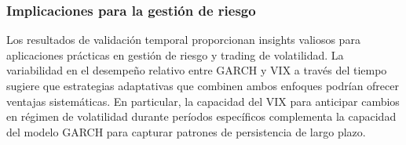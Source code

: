 \subsubsection{Implicaciones para la gestión de riesgo}

Los resultados de validación temporal proporcionan insights valiosos para aplicaciones prácticas en gestión de riesgo y trading de volatilidad. La variabilidad en el desempeño relativo entre GARCH y VIX a través del tiempo sugiere que estrategias adaptativas que combinen ambos enfoques podrían ofrecer ventajas sistemáticas. En particular, la capacidad del VIX para anticipar cambios en régimen de volatilidad durante períodos específicos complementa la capacidad del modelo GARCH para capturar patrones de persistencia de largo plazo.